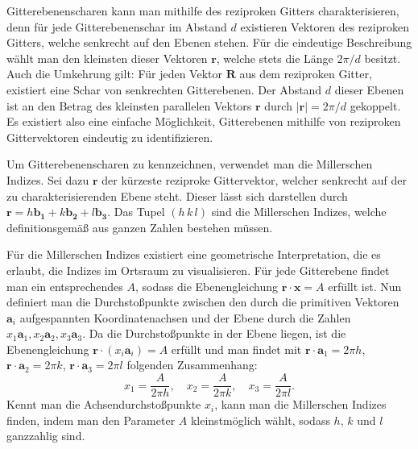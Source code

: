 Gitterebenenscharen kann man mithilfe des reziproken Gitters charakterisieren, denn für jede
Gitterebenenschar im Abstand $d$ existieren Vektoren des reziproken Gitters, welche senkrecht auf den Ebenen stehen.
Für die eindeutige Beschreibung wählt man den kleinsten dieser Vektoren $\mathbf{r}$, welche stets die Länge $2 \pi / d$ besitzt.
Auch die Umkehrung gilt: Für jeden Vektor $\mathbf{R}$ aus dem reziproken Gitter, existiert eine Schar von senkrechten
Gitterebenen.
Der Abstand $d$ dieser Ebenen ist an den Betrag des kleinsten parallelen Vektors $\mathbf{r}$ durch $\lvert \mathbf{r}
\rvert=2\pi  /d$ gekoppelt.
Es existiert also eine einfache Möglichkeit, Gitterebenen mithilfe von reziproken Gittervektoren eindeutig zu
identifizieren. \autocite[113]{Ashcroft}

Um Gitterebenenscharen zu kennzeichnen, verwendet man die Millerschen Indizes.
Sei dazu $\mathbf{r}$ der kürzeste reziproke Gittervektor, welcher senkrecht auf der zu charakterisierenden Ebene steht.
Dieser lässt sich darstellen durch $ \mathbf{r} = h \mathbf{b_1} + k \mathbf{b_2} + l \mathbf{b_3}$.
Das Tupel $(h\, k\,l)$ sind die Millerschen Indizes, welche definitionsgemäß aus ganzen Zahlen bestehen müssen.


Für die Millerschen Indizes existiert eine geometrische Interpretation, die es erlaubt, die Indizes im Ortsraum zu
visualisieren.
Für jede Gitterebene findet man ein entsprechendes $A$, sodass die Ebenengleichung $\mathbf{r} \cdot \mathbf{x} = A$
erfüllt ist.
Nun definiert man die Durchstoßpunkte zwischen den durch die primitiven Vektoren $\mathbf{a}_i$ aufgespannten
Koordinatenachsen und der Ebene durch die Zahlen $x_{1}\mathbf{a}_{1}, x_{2}\mathbf{a}_{2}, x_{3}\mathbf{a}_{3}$.
Da die Durchstoßpunkte in der Ebene liegen, ist die Ebenengleichung $\mathbf{r}\cdot(x_{i}\mathbf{a}_{i})=A$ erfüllt und
man findet mit $\mathbf{r}\cdot\mathbf{a}_{1}=2\pi h$, $\mathbf{r}\cdot \mathbf{a}_{2}=2\pi k$,
$ \mathbf{r}\cdot \mathbf{a}_{3}=2\pi l$ folgenden Zusammenhang:
\begin{equation*}
    x_{1}=\frac{A}{2\pi h}, \quad x_{2}=\frac{A}{2\pi k}, \quad x_{3} =\frac{A}{2\pi l}.
\end{equation*}
Kennt man die Achsendurchstoßpunkte $x_i$, kann man die Millerschen Indizes finden, indem man den Parameter $A$
kleinstmöglich wählt, sodass $h$, $k$ und $l$ ganzzahlig sind. \autocite[115]{Ashcroft}

